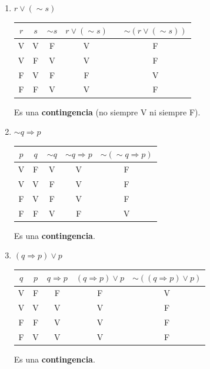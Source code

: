 \documentclass[12pt]{article}
\begin{document}
\begin{enumerate}[label=\roman*)]
    \item $r \vee (\sim s)$

    \begin{center}
    \begin{tabular}{cc|c|cc|c}
        \toprule
        $r$ & $s$ & $\sim s$ & $r \vee (\sim s)$ & & $\sim(r \vee (\sim s))$ \\
        \midrule
        V & V & F & V & & F \\
        V & F & V & V & & F \\
        F & V & F & F & & V \\
        F & F & V & V & & F \\
        \bottomrule
    \end{tabular}
    \end{center}
    Es una \textbf{contingencia} (no siempre V ni siempre F).

    \item $\sim q \Rightarrow p$

    \begin{center}
    \begin{tabular}{cc|c|c|c}
        \toprule
        $p$ & $q$ & $\sim q$ & $\sim q \Rightarrow p$ & $\sim(\sim q \Rightarrow p)$ \\
        \midrule
        V & F & V & V & F \\
        V & V & F & V & F \\
        F & V & F & V & F \\
        F & F & V & F & V \\
        \bottomrule
    \end{tabular}
    \end{center}
    Es una \textbf{contingencia}.

    \item $(q \Rightarrow p) \vee p$

    \begin{center}
    \begin{tabular}{cc|c|c|c}
        \toprule
        $q$ & $p$ & $q \Rightarrow p$ & $(q \Rightarrow p) \vee p$ & $\sim((q \Rightarrow p) \vee p)$ \\
        \midrule
        V & F & F & F & V \\
        V & V & V & V & F \\
        F & F & V & V & F \\
        F & V & V & V & F \\
        \bottomrule
    \end{tabular}
    \end{center}
    Es una \textbf{contingencia}.


\end{enumerate}
\end{document}
